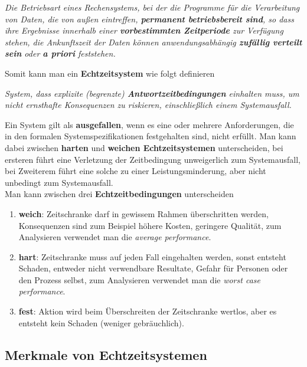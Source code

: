 \documentclass[a4paper, 10 pt, conference]{ieeeconf}
\begin{document}
\begin{center}
\textit{Die Betriebsart eines Rechensystems, bei der die Programme für die Verarbeitung von Daten, die von außen eintreffen, \textbf{permanent betriebsbereit sind}, so dass ihre Ergebnisse innerhalb einer \textbf{vorbestimmten Zeitperiode} zur Verfügung stehen, die Ankunftszeit der Daten können anwendungsabhängig \textbf{zufällig verteilt sein} oder \textbf{a priori} feststehen.}
\end{center} 

Somit kann man ein \textbf{Echtzeitsystem} wie folgt definieren

\begin{center}
\textit{System, dass explizite (begrenzte) \textbf{Antwortzeitbedingungen} einhalten muss, um nicht ernsthafte Konsequenzen zu riskieren, einschließlich einem Systemausfall.} 
\end{center}

Ein System gilt als \textbf{ausgefallen}, wenn es eine oder mehrere Anforderungen, die in den formalen Systemspezifikationen festgehalten sind, nicht erfüllt. Man kann dabei zwischen \textbf{harten} und \textbf{weichen Echtzeitsystemen} unterscheiden, bei ersteren führt 	eine Verletzung der Zeitbedingung unweigerlich zum Systemausfall, bei Zweiterem führt eine solche zu einer Leistungsminderung, aber nicht unbedingt zum Systemausfall. \\
\pagebreak
Man kann zwischen drei \textbf{Echtzeitbedingungen} unterscheiden
\begin{enumerate}
\item \textbf{weich}: Zeitschranke darf in gewissem Rahmen überschritten werden, Konsequenzen sind zum Beispiel höhere Kosten, geringere Qualität, zum Analysieren verwendet man die \textit{average performance}. 
\item \textbf{hart}: Zeitschranke muss auf jeden Fall eingehalten werden, sonst entsteht Schaden, entweder nicht verwendbare Resultate, Gefahr für Personen oder den Prozess selbst, zum Analysieren verwendet man die \textit{worst case performance}. 
\item \textbf{fest}: Aktion wird beim Überschreiten der Zeitschranke wertlos, aber es entsteht kein Schaden (weniger gebräuchlich).
\end{enumerate}

\subsection*{\textbf{Merkmale von Echtzeitsystemen}}
\end{document}
